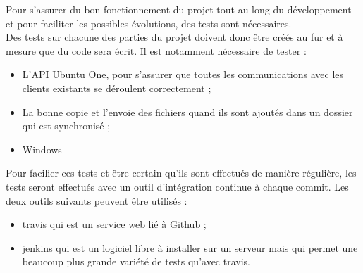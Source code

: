 Pour s'assurer du bon fonctionnement du projet tout au long du développement et pour faciliter les possibles évolutions, des tests sont nécessaires.\\

Des tests sur chacune des parties du projet doivent donc être créés au fur et à mesure que du code sera écrit. Il est notamment nécessaire de tester :\\

\begin{itemize}
\renewcommand{\labelitemi}{$\bullet$}
\item L'API Ubuntu One, pour s'assurer que toutes les communications avec les clients existants se déroulent correctement ;
\item La bonne copie et l'envoie des fichiers quand ils sont ajoutés dans un dossier qui est synchronisé ;
\item Windows
\end{itemize}

\vspace{0.5cm}

Pour facilier ces tests et être certain qu'ils sont effectués de manière régulière, les tests seront effectués avec un outil d'intégration continue à chaque commit. Les deux outils suivants peuvent être utilisés :\\

\begin{itemize}
\renewcommand{\labelitemi}{$\bullet$}
\item \href{https://travis-ci.org}{travis} qui est un service web lié à Github ;
\item \href{http://jenkins-ci.org}{jenkins} qui est un logiciel libre à installer sur un serveur mais qui permet une beaucoup plus grande variété de tests qu'avec travis.
\end{itemize}
